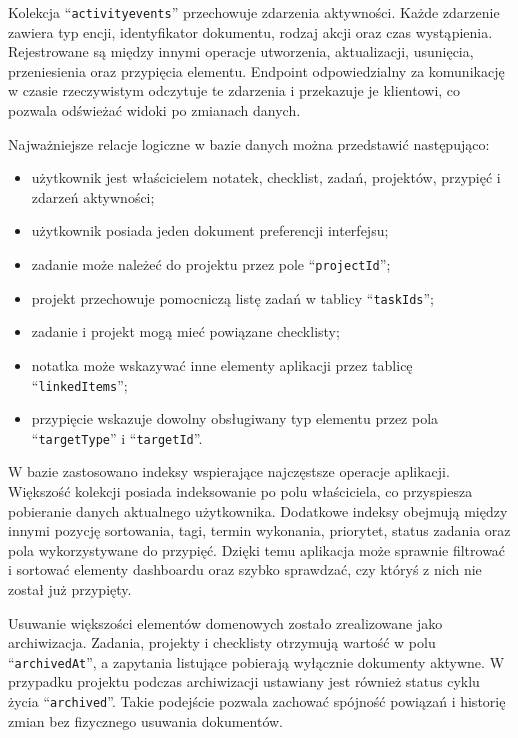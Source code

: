 \documentclass[12pt,a4paper,twoside]{report}
\begin{document}
Kolekcja ``\texttt{activityevents}'' przechowuje zdarzenia aktywności. Każde zdarzenie zawiera typ encji, identyfikator dokumentu, rodzaj akcji oraz czas wystąpienia. Rejestrowane są między innymi operacje utworzenia, aktualizacji, usunięcia, przeniesienia oraz przypięcia elementu. Endpoint odpowiedzialny za komunikację w czasie rzeczywistym odczytuje te zdarzenia i przekazuje je klientowi, co pozwala odświeżać widoki po zmianach danych.

Najważniejsze relacje logiczne w bazie danych można przedstawić następująco:

\begin{itemize}
\item
  użytkownik jest właścicielem notatek, checklist, zadań, projektów, przypięć i zdarzeń aktywności;
\item
  użytkownik posiada jeden dokument preferencji interfejsu;
\item
  zadanie może należeć do projektu przez pole ``\texttt{projectId}'';
\item
  projekt przechowuje pomocniczą listę zadań w tablicy ``\texttt{taskIds}'';
\item
  zadanie i projekt mogą mieć powiązane checklisty;
\item
  notatka może wskazywać inne elementy aplikacji przez tablicę ``\texttt{linkedItems}'';
\item
  przypięcie wskazuje dowolny obsługiwany typ elementu przez pola ``\texttt{targetType}'' i ``\texttt{targetId}''.
\end{itemize}

W bazie zastosowano indeksy wspierające najczęstsze operacje aplikacji. Większość kolekcji posiada indeksowanie po polu właściciela, co przyspiesza pobieranie danych aktualnego użytkownika. Dodatkowe indeksy obejmują między innymi pozycję sortowania, tagi, termin wykonania, priorytet, status zadania oraz pola wykorzystywane do przypięć. Dzięki temu aplikacja może sprawnie filtrować i sortować elementy dashboardu oraz szybko sprawdzać, czy któryś z nich nie został już przypięty.

Usuwanie większości elementów domenowych zostało zrealizowane jako archiwizacja. Zadania, projekty i checklisty otrzymują wartość w polu ``\texttt{archivedAt}'', a zapytania listujące pobierają wyłącznie dokumenty aktywne. W przypadku projektu podczas archiwizacji ustawiany jest również status cyklu życia ``\texttt{archived}''. Takie podejście pozwala zachować spójność powiązań i historię zmian bez fizycznego usuwania dokumentów.
\end{document}
